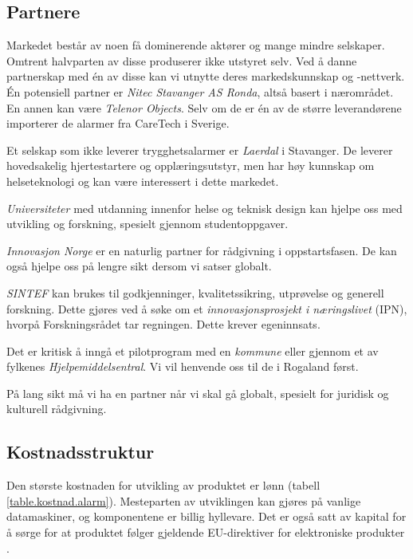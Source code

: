 \subsection{Partnere}


Markedet består av noen få dominerende aktører og mange mindre selskaper.
Omtrent halvparten av disse produserer ikke utstyret selv. Ved å danne
partnerskap med én av disse kan vi utnytte deres markedskunnskap og -nettverk.
Én potensiell partner er \textit{Nitec Stavanger AS Ronda}, altså basert i
nærområdet.  En annen kan være \textit{Telenor Objects}. Selv om de er én av de
større leverandørene importerer de alarmer fra CareTech i Sverige.

Et selskap som ikke leverer trygghetsalarmer er \textit{Laerdal} i Stavanger.
De leverer hovedsakelig hjertestartere og opplæringsutstyr, men har høy
kunnskap om helseteknologi og kan være interessert i dette markedet.

\textit{Universiteter} med utdanning innenfor helse og teknisk design kan
hjelpe oss med utvikling og forskning, spesielt gjennom studentoppgaver.

\textit{Innovasjon Norge} er en naturlig partner for rådgivning i
oppstartsfasen. De kan også hjelpe oss på lengre sikt dersom vi satser globalt.

\textit{SINTEF} kan brukes til godkjenninger, kvalitetssikring, utprøvelse og
generell forskning. Dette gjøres ved å søke om et \textit{innovasjonsprosjekt i
næringslivet} (IPN), hvorpå Forskningsrådet tar regningen. Dette krever
egeninnsats.

Det er kritisk å inngå et pilotprogram med en \textit{kommune} eller gjennom et av
fylkenes \textit{Hjelpemiddelsentral}. Vi vil henvende oss til de i Rogaland først.

På lang sikt må vi ha en partner når vi skal gå globalt, spesielt for juridisk
og kulturell rådgivning.

\subsection{Kostnadsstruktur}


Den største kostnaden for utvikling av produktet er lønn (tabell
\vref{table.kostnad.alarm}). Mesteparten av utviklingen kan gjøres på vanlige
datamaskiner, og komponentene er billig hyllevare. Det er også satt av kapital
for å sørge for at produktet følger gjeldende EU-direktiver for elektroniske
produkter \cite{dir.rohs, dir.2001.95}.

